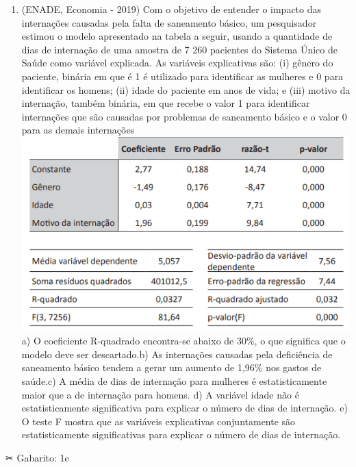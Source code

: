 \documentclass[
]{book}
\providecommand{\tightlist}{%
  \setlength{\itemsep}{0pt}\setlength{\parskip}{0pt}}
\begin{document}
\begin{question}

\begin{enumerate}
\def\labelenumi{\arabic{enumi}.}
\tightlist
\item
  (ENADE, Economia - 2019) Com o objetivo de entender o impacto das internações causadas pela falta de saneamento básico, um pesquisador estimou o modelo apresentado na tabela a seguir, usando a quantidade de dias de internação de uma amostra de 7 260 pacientes do Sistema Único de Saúde como variável explicada. As variáveis explicativas são: (i) gênero do paciente, binária em que é 1 é utilizado para identificar as mulheres e 0 para identificar os homens; (ii) idade do paciente em anos de vida; e (iii) motivo da internação, também binária, em que recebe o valor 1 para identificar internações que são causadas por problemas de saneamento básico e o valor 0 para as demais internações\includegraphics{./img/exercicio_regressao.png}a) O coeficiente R-quadrado encontra-se abaixo de 30\%, o que significa que o modelo deve ser descartado.b) As internações causadas pela deficiência de saneamento básico tendem a gerar um aumento de 1,96\% nos gastos de saúde.c) A média de dias de internação para mulheres é estatisticamente maior que a de internação para homens. d) A variável idade não é estatisticamente significativa para explicar o número de dias de internação. e) O teste F mostra que as variáveis explicativas conjuntamente são estatisticamente significativas para explicar o número de dias de internação.\\
\end{enumerate}

\end{question}

\begin{mirror}

✂ Gabarito: 1e

\end{mirror}
\end{document}

